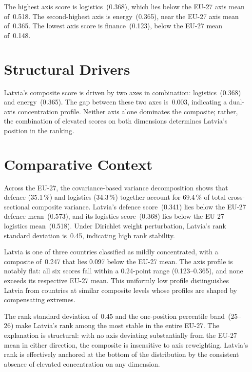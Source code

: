 \documentclass[12pt,a4paper]{article}
\begin{document}
The highest axis score is logistics~(0.368), which lies below the EU-27 axis mean of~0.518.  The second-highest axis is energy~(0.365), near the EU-27 axis mean of~0.365.  The lowest axis score is finance~(0.123), below the EU-27 mean of~0.148.


\section{Structural Drivers}
\label{sec:drivers}

\begin{sloppypar}
Latvia's composite score is driven by two axes in combination: logistics~(0.368) and energy~(0.365).  The gap between these two axes is~0.003, indicating a dual-axis concentration profile.  Neither axis alone dominates the composite; rather, the combination of elevated scores on both dimensions determines Latvia's position in the ranking.
\end{sloppypar}


\section{Comparative Context}
\label{sec:comparative}

Across the EU-27, the covariance-based variance decomposition shows that defence (35.1\,\%) and logistics (34.3\,\%) together account for 69.4\,\% of total cross-sectional composite variance.  Latvia's defence score~(0.341) lies below the EU-27 defence mean~(0.573), and its logistics score~(0.368) lies below the EU-27 logistics mean~(0.518).  Under Dirichlet weight perturbation, Latvia's rank standard deviation is~0.45, indicating high rank stability.



Latvia is one of three countries classified as mildly concentrated, with a composite of~0.247 that lies 0.097 below the EU-27 mean.  The axis profile is notably flat: all six scores fall within a 0.24-point range (0.123--0.365), and none exceeds its respective EU-27 mean.  This uniformly low profile distinguishes Latvia from countries at similar composite levels whose profiles are shaped by compensating extremes.

The rank standard deviation of~0.45 and the one-position percentile band~(25--26) make Latvia's rank among the most stable in the entire EU-27.  The explanation is structural: with no axis deviating substantially from the EU-27 mean in either direction, the composite is insensitive to axis reweighting.  Latvia's rank is effectively anchored at the bottom of the distribution by the consistent absence of elevated concentration on any dimension.
\end{document}
